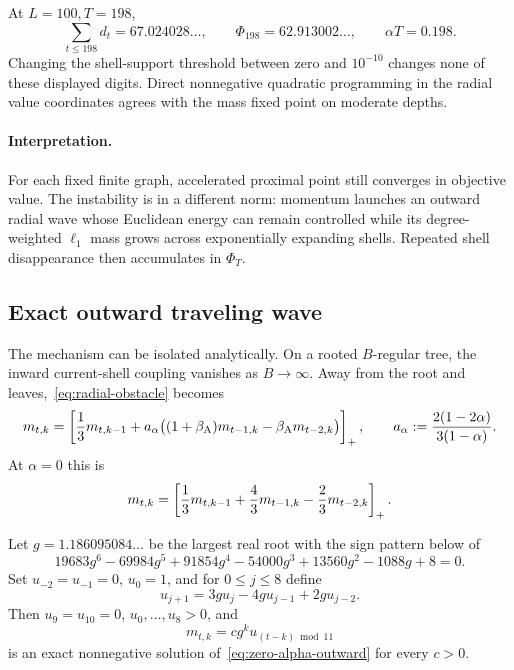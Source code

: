 At $L=100,T=198$,
\[
 \sum_{t\le198}d_t=67.024028\ldots,
 \qquad
 \Phi_{198}=62.913002\ldots,
 \qquad
 \alpha T=0.198.
\]
Changing the shell-support threshold between zero and $10^{-10}$ changes none
of these displayed digits.  Direct nonnegative quadratic programming in the
radial value coordinates agrees with the mass fixed point on moderate depths.

\paragraph{Interpretation.}
For each fixed finite graph, accelerated proximal point still converges in
objective value.  The instability is in a different norm: momentum launches
an outward radial wave whose Euclidean energy can remain controlled while its
degree-weighted $\ell_1$ mass grows across exponentially expanding shells.
Repeated shell disappearance then accumulates in $\Phi_T$.

\subsection{Exact outward traveling wave}

The mechanism can be isolated analytically.  On a rooted $B$-regular tree,
the inward current-shell coupling vanishes as $B\to\infty$.  Away from the
root and leaves,~\eqref{eq:radial-obstacle} becomes
\begin{equation}
 m_{t,k}
 =\left[
   \frac13m_{t,k-1}
   +a_\alpha\bigl((1+\beta_{\mathrm A})m_{t-1,k}-\beta_{\mathrm A} m_{t-2,k}\bigr)
 \right]_{+},
 \qquad
 a_\alpha:=\frac{2(1-2\alpha)}{3(1-\alpha)}.
 \label{eq:outward-recurrence}
\end{equation}
At $\alpha=0$ this is
\begin{equation}
 m_{t,k}
 =\left[
   \frac13m_{t,k-1}
   +\frac43m_{t-1,k}-\frac23m_{t-2,k}
 \right]_{+}.
 \label{eq:zero-alpha-outward}
\end{equation}

\begin{proposition}
\label{prop:period-eleven-wave}
Let $g=1.186095084\ldots$ be the largest real root with the sign pattern
below of
\begin{equation}
 19683g^6-69984g^5+91854g^4-54000g^3
 +13560g^2-1088g+8=0.
 \label{eq:g-polynomial}
\end{equation}
Set $u_{-2}=u_{-1}=0$, $u_0=1$, and for $0\le j\le8$ define
\begin{equation}
 u_{j+1}=3g u_j-4g u_{j-1}+2g u_{j-2}.
 \label{eq:phase-recurrence}
\end{equation}
Then $u_9=u_{10}=0$, $u_0,\ldots,u_8>0$, and
\begin{equation}
 m_{t,k}=c g^k u_{(t-k)\bmod 11}
 \label{eq:traveling-wave}
\end{equation}
is an exact nonnegative solution of~\eqref{eq:zero-alpha-outward} for every
$c>0$.
\end{proposition}

